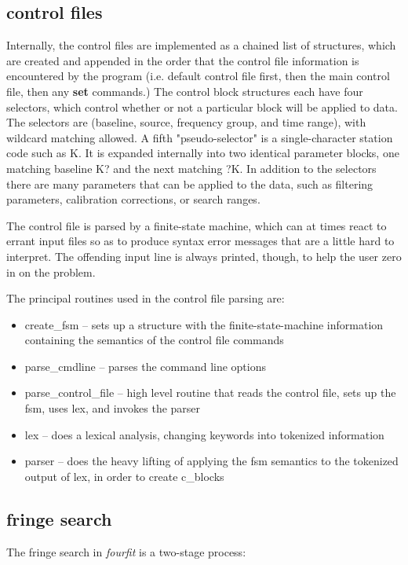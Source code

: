 \subsection{control files}
Internally, the control files are implemented as a chained list of
structures, which are created and appended in the order that the control
file information
is encountered by the program (i.e. default control file first, then the
main control file, then any \textbf{set} commands.) The control block structures
each have four selectors, which control whether or not a particular
block will be applied to data. The selectors are (baseline, source, frequency
group, and time range), with wildcard matching allowed. A fifth 
"pseudo-selector" is a single-character station code such as K. It is expanded
internally into two identical parameter blocks, one matching baseline K? and the
next matching ?K. In addition to the selectors there are many parameters
that can be applied to the data, such as filtering parameters, calibration
corrections, or search ranges.

The control file is parsed by a finite-state machine, which can at times
react to errant input files so as to produce syntax error messages 
that are a little hard to interpret. The offending input line is always
printed, though, to help the user zero in on the problem.

The principal routines used in the control file parsing are:
\begin{itemize}
\item create\_fsm -- sets up a structure with the finite-state-machine information
containing the semantics of the control file commands
\item parse\_cmdline -- parses the command line options
\item parse\_control\_file -- high level routine that reads the control file, sets up
the fsm, uses lex, and invokes the parser
\item lex -- does a lexical analysis, changing keywords into tokenized information
\item parser -- does the heavy lifting of applying the fsm semantics to the tokenized
output of lex, in order to create c\_blocks
\end{itemize}

\subsection{fringe search}
The fringe search in \textit{fourfit} is a two-stage process:


